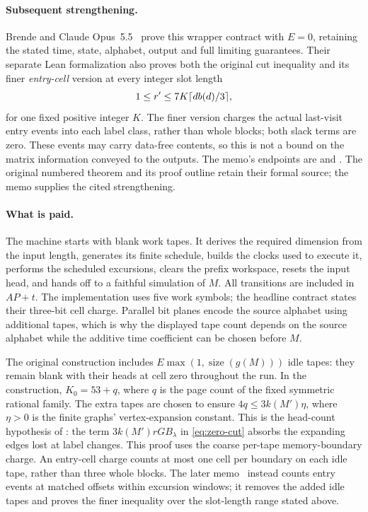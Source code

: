 \paragraph{Subsequent strengthening.}
Brende and Claude Opus~5.5~\cite{PaddingMemo2026} prove this wrapper contract
with $E=0$, retaining the stated time, state, alphabet, output and full
limiting guarantees. Their separate Lean formalization also proves both
the original cut inequality and its finer \emph{entry-cell} version at every
integer slot length
\[
 1\le r'\le 7K\lceil db(d)/3\rceil,
\]
for one fixed positive integer $K$. The finer version charges the actual
last-visit entry events into each label class, rather than whole blocks;
both slack terms are zero. These events may carry data-free contents, so
this is not a bound on the matrix information conveyed to the outputs.
The memo's endpoints are
 and
.
The original numbered theorem and its proof outline retain their formal source;
the memo supplies the cited strengthening.

\paragraph{What is paid.}
The machine starts with blank work tapes. It derives the required dimension
from the input length, generates its finite schedule, builds the clocks used
to execute it, performs the scheduled excursions, clears the prefix workspace,
resets the input head, and hands off to a faithful simulation of $M$.
All transitions are included in $AP+t$. The implementation uses five work
symbols; the headline contract states their three-bit cell charge. Parallel
bit planes encode the source alphabet using additional tapes, which is why
the displayed tape count depends on the source alphabet while the additive
time coefficient can be chosen before $M$.

The original construction includes $E\max(1,\operatorname{size}(g(M)))$ idle tapes:
they remain blank with their heads at cell zero throughout the run. In the
construction, $K_0=53+q$, where $q$ is the page count of the fixed symmetric
rational family. The extra tapes are chosen to ensure $4q\le3k(M')\eta$,
where $\eta>0$ is the finite graphs' vertex-expansion constant. This is the
head-count hypothesis of : the term
$3k(M')rG B_\lambda$ in \eqref{eq:zero-cut} absorbs the expanding edges lost
at label changes. This proof uses the coarse per-tape memory-boundary charge.
An entry-cell charge counts at most one cell per boundary on each idle tape,
rather than three whole blocks. The later memo~\cite{PaddingMemo2026}
instead counts entry events at matched offsets within excursion windows;
it removes the added idle tapes and proves the finer inequality over the
slot-length range stated above.

